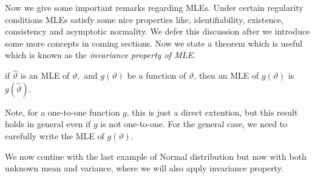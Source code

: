 \documentclass[ 11pt,%
				a4paper,%
				twoside,%
				headinclude,%
				footinclude = true,%
				cleardoublepage = empty,%
				reqno]{scrbook}
\begin{document}







Now we give some important remarks regarding MLEs. Under certain regularity conditions MLEs satisfy some nice properties like, identifiability, existence, consistency and asymptotic normality. We defer this discussion after we introduce some more concepts in coming sections. Now we state a theorem which is useful which is known as the \emph{invariance property of MLE}.

\begin{theorem}
  if $\hat{\vartheta}$ is an MLE of $\vartheta,$ and $g(\vartheta)$ be a function of $\vartheta$, then an MLE of $g(\vartheta)$ is $g(\hat{\vartheta})$.
\end{theorem}

Note, for a one-to-one function $g$, this is just a direct extention, but this result holds in general even if $g$ is not one-to-one. For the general case, we need to carefully write the MLE of $g(\vartheta)$.

We now contiue with the last example of Normal distribution but now with both unknown mean and variance, where we will also apply invariance property.
\end{document}
